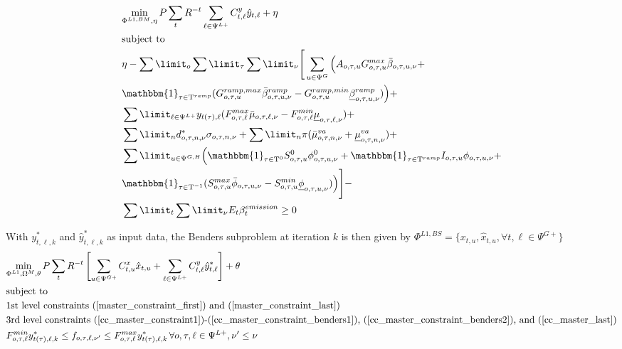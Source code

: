 \documentclass[final]{IEEEtran}
\newcommand{\Tau}{\mathrm{T}}
\begin{document}
\begin{align}
&\label{benders_master_obj} \underset{\Phi^{L1, BM}, \eta}{\text{min}} \, P \sum\limits_{t} R^{-t} \sum\limits_{\ell \in \Psi^{L+}} C^y_{t, \ell} \hat{y}_{t, \ell} + \eta \\
&\text{subject to} \nonumber \\
&\eta - \sum\limit_{o} \sum\limit_{\tau} \sum\limit_{\nu} \Bigg[ \sum\limits_{u \in \Psi^G} \Big( A_{o, \tau, u} G_{o, \tau, u}^{max} \bar{\beta}_{o, \tau, u, \nu} + \nonumber \\
&\mathbbm{1}_{\tau \in \Tau^{ramp}} (G^{ramp,max}_{o, \tau, u} \bar{\beta}_{o, \tau, u, \nu}^{ramp} - G^{ramp,min}_{o, \tau, u} \underline{\beta}_{o, \tau, u, \nu}^{ramp}) \Big) + \nonumber \\
&\sum\limit_{\ell \in \Psi^{L+}} y_{t(\tau), \ell} (F_{o, \tau, \ell}^{max} \bar{\mu}_{o, \tau, \ell, \nu} - F_{o, \tau, \ell}^{min} \underline{\mu}_{o, \tau, \ell, \nu}) + \nonumber \\
&\sum\limit_n d_{o, \tau, n, \nu}^* \sigma_{o, \tau, n, \nu} + \sum\limit_n \pi (\bar{\mu}^{va}_{o, \tau, n, \nu} + \underline{\mu}^{va}_{o, \tau, n, \nu}) + \nonumber \\
&\sum\limit_{u \in \Psi^{G,H}} \Big( \mathbbm{1}_{\tau \in \Tau^{0}} S^0_{o, \tau, u} \phi_{o, \tau, u, \nu}^{0} + \mathbbm{1}_{\tau \in \Tau^{ramp}} I_{o, \tau, u} \phi_{o, \tau, u, \nu} + \nonumber \\
&\mathbbm{1}_{\tau \in \Tau^{-1}} (S^{max}_{o, \tau, u} \bar{\phi}_{o, \tau, u, \nu} - S^{min}_{o, \tau, u} \underline{\phi}_{o, \tau, u, \nu}) \Big) \Bigg] - \nonumber \\
&\sum\limit_{t} \sum\limit_{\nu} E_{t} \beta_{t}^{emission} \geq 0
\end{align}

With $y^*_{t, \ell, k}$ and $\hat{y}^*_{t, \ell, k}$ as input data, the Benders subproblem at iteration $k$ is then given by $\Phi^{L1, BS} = \{ x_{t, u}, \hat{x}_{t, u}, \forall t, \ell \in \Psi^{G+} \}$
\begin{align}
&\label{benders_sub_obj} \underset{\Phi^{L1}, \Omega^{M}, \theta}{\text{min}} \, P \sum\limits_{t} R^{-t} \left[ \sum\limits_{u \in \Psi^{G+}} C^x_{t, u} \hat{x}_{t, u} + \sum\limits_{\ell \in \Psi^{L+}} C^y_{t, \ell} \hat{y}^*_{t, \ell} \right] + \theta \\
&\text{subject to} \nonumber \\
&\textrm{1st level constraints (\ref{master_constraint_first}) and (\ref{master_constraint_last})} \nonumber \\
&\textrm{3rd level constraints (\ref{cc_master_constraint1})-(\ref{cc_master_constraint_benders1}), (\ref{cc_master_constraint_benders2}), and (\ref{cc_master_last}}) \nonumber \\
&F_{o, \tau, \ell}^{min} y^*_{t(\tau), \ell, k} \leq f_{o, \tau, \ell, \nu'} \leq F_{o, \tau, \ell}^{max} y^*_{t(\tau), \ell, k} \, \forall o, \tau, \ell \in \Psi^{L+}, \nu' \leq \nu
\end{align}
\end{document}
